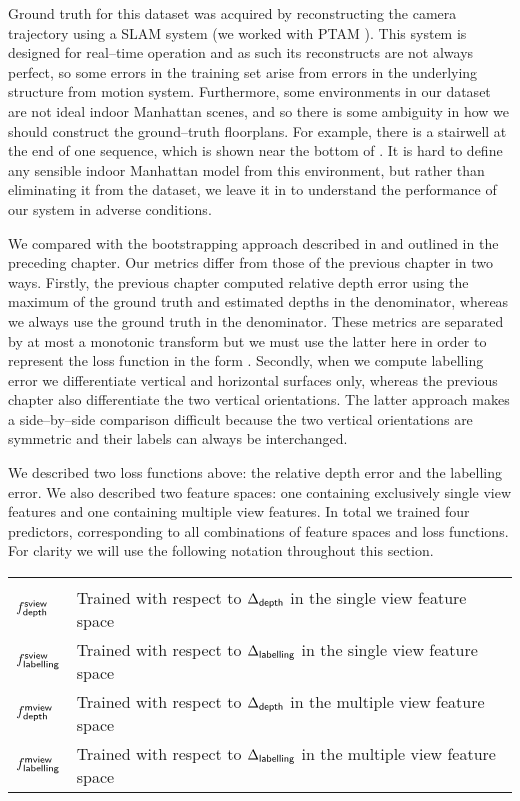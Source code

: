 Ground truth for this dataset was acquired by reconstructing the
camera trajectory using a SLAM system (we worked with PTAM
\cite{Klein07}). This system is designed for real--time operation and
as such its reconstructs are not always perfect, so some errors in the
training set arise from errors in the underlying structure from motion
system. Furthermore, some environments in our dataset are not ideal
indoor Manhattan scenes, and so there is some ambiguity in how we
should construct the ground--truth floorplans. For example, there is a
stairwell at the end of one sequence, which is shown near the bottom
of . It is hard to define any sensible
indoor Manhattan model from this environment, but rather than
eliminating it from the dataset, we leave it in to understand the
performance of our system in adverse conditions.\changedsinceviva

We compared with the bootstrapping approach described in
\cite{Flint11} and outlined in the preceding chapter. Our metrics
differ from those of the previous chapter in two ways. Firstly, the
previous chapter computed relative depth error using the maximum of
the ground truth and estimated depths in the denominator, whereas we
always use the ground truth in the denominator. These metrics are
separated by at most a monotonic transform but we must use the latter
here in order to represent the loss function in the form
. Secondly, when we compute labelling error
we differentiate vertical and horizontal surfaces only, whereas the
previous chapter also differentiate the two vertical orientations. The
latter approach makes a side--by--side comparison difficult because
the two vertical orientations are symmetric and their labels can
always be interchanged.

We described two loss functions above: the relative depth error and
the labelling error. We also described two feature spaces: one
containing exclusively single view features and one containing
multiple view features. In total we trained four predictors,
corresponding to all combinations of feature spaces and loss
functions. For clarity we will use the following notation throughout
this section.

\begin{tabular}{p{20mm}l}
  &\\
  $\Fsviewdepth$ & Trained with respect to
  $\DepthLoss$ in the single view feature space \vspace{2mm} \\
  $\Fsviewlbl$ & Trained with respect to
  $\LblLoss$ in the single view feature space \vspace{2mm} \\
  $\Fmviewdepth$ & Trained with respect to
  $\DepthLoss$ in the multiple view feature space \vspace{2mm} \\
  $\Fmviewlbl$ & Trained with respect to
  $\LblLoss$ in the multiple view feature space \vspace{2mm} 
\end{tabular}

